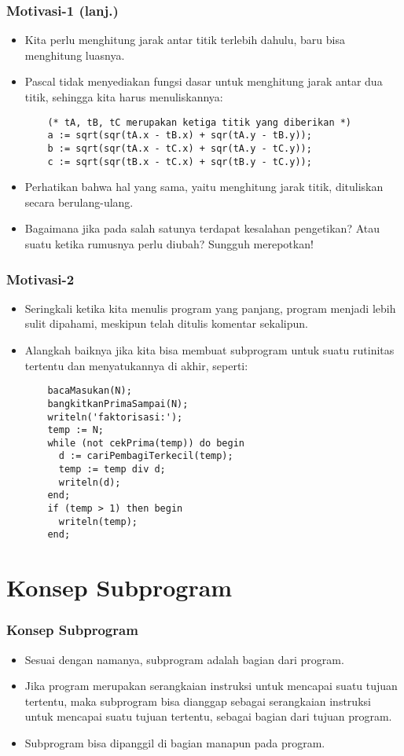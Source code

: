 \begin{frame}[fragile]
\frametitle{Motivasi-1 (lanj.)}
\begin{itemize}
  \item Kita perlu menghitung jarak antar titik terlebih dahulu, baru bisa menghitung luasnya.
  \item Pascal tidak menyediakan fungsi dasar untuk menghitung jarak antar dua titik, sehingga kita harus menuliskannya:
  \begin{lstlisting}
    (* tA, tB, tC merupakan ketiga titik yang diberikan *)
    a := sqrt(sqr(tA.x - tB.x) + sqr(tA.y - tB.y));
    b := sqrt(sqr(tA.x - tC.x) + sqr(tA.y - tC.y));
    c := sqrt(sqr(tB.x - tC.x) + sqr(tB.y - tC.y));
  \end{lstlisting}
  \item Perhatikan bahwa hal yang sama, yaitu menghitung jarak titik, dituliskan secara berulang-ulang.
  \item Bagaimana jika pada salah satunya terdapat kesalahan pengetikan? Atau suatu ketika rumusnya perlu diubah? Sungguh merepotkan!
\end{itemize}
\end{frame}

\begin{frame}[fragile]
\frametitle{Motivasi-2}
\begin{itemize}
  \item Seringkali ketika kita menulis program yang panjang, program menjadi lebih sulit dipahami, meskipun telah ditulis komentar sekalipun.
  \item Alangkah baiknya jika kita bisa membuat subprogram untuk suatu rutinitas tertentu dan menyatukannya di akhir, seperti:
  \begin{lstlisting}
    bacaMasukan(N);
    bangkitkanPrimaSampai(N);
    writeln('faktorisasi:');
    temp := N;
    while (not cekPrima(temp)) do begin
      d := cariPembagiTerkecil(temp);
      temp := temp div d;
      writeln(d);
    end;
    if (temp > 1) then begin
      writeln(temp);
    end;
  \end{lstlisting}
\end{itemize}
\end{frame}

\section{Konsep Subprogram}
\frame{\sectionpage}

\begin{frame}
\frametitle{Konsep Subprogram}
\begin{itemize}
  \item Sesuai dengan namanya, subprogram adalah bagian dari program.
  \item Jika program merupakan serangkaian instruksi untuk mencapai suatu tujuan tertentu, maka subprogram bisa dianggap sebagai serangkaian instruksi untuk mencapai suatu tujuan tertentu, \alert{sebagai bagian dari tujuan program}.
  \item Subprogram bisa dipanggil di bagian manapun pada program.
\end{itemize}
\end{frame}

